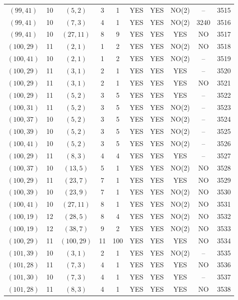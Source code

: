 \begin{longtable}{|c|c|c|c|c|c|c|c|c|c|}
$(99, 41)$ & 10 & $(5, 2)$ & 3 & 1 & YES & YES & NO(2) & -- & 3515\\
$(99, 41)$ & 10 & $(7, 3)$ & 4 & 1 & YES & YES & NO(2) & 3240 & 3516\\
$(99, 41)$ & 10 & $(27, 11)$ & 8 & 9 & YES & YES & YES & NO & 3517\\
$(100, 29)$ & 11 & $(2, 1)$ & 1 & 2 & YES & YES & NO(2) & NO & 3518\\
$(100, 41)$ & 10 & $(2, 1)$ & 1 & 2 & YES & YES & NO(2) & -- & 3519\\
$(100, 29)$ & 11 & $(3, 1)$ & 2 & 1 & YES & YES & YES & -- & 3520\\
$(100, 29)$ & 11 & $(3, 1)$ & 2 & 1 & YES & YES & YES & NO & 3521\\
$(100, 29)$ & 11 & $(5, 2)$ & 3 & 5 & YES & YES & YES & -- & 3522\\
$(100, 31)$ & 11 & $(5, 2)$ & 3 & 5 & YES & YES & NO(2) & -- & 3523\\
$(100, 37)$ & 10 & $(5, 2)$ & 3 & 5 & YES & YES & NO(2) & -- & 3524\\
$(100, 39)$ & 10 & $(5, 2)$ & 3 & 5 & YES & YES & NO(2) & -- & 3525\\
$(100, 41)$ & 10 & $(5, 2)$ & 3 & 5 & YES & YES & NO(2) & -- & 3526\\
$(100, 29)$ & 11 & $(8, 3)$ & 4 & 4 & YES & YES & YES & -- & 3527\\
$(100, 37)$ & 10 & $(13, 5)$ & 5 & 1 & YES & YES & NO(2) & NO & 3528\\
$(100, 29)$ & 11 & $(23, 7)$ & 7 & 1 & YES & YES & YES & NO & 3529\\
$(100, 39)$ & 10 & $(23, 9)$ & 7 & 1 & YES & YES & NO(2) & NO & 3530\\
$(100, 41)$ & 10 & $(27, 11)$ & 8 & 1 & YES & YES & NO(2) & NO & 3531\\
$(100, 19)$ & 12 & $(28, 5)$ & 8 & 4 & YES & YES & NO(2) & NO & 3532\\
$(100, 19)$ & 12 & $(38, 7)$ & 9 & 2 & YES & YES & NO(2) & NO & 3533\\
$(100, 29)$ & 11 & $(100, 29)$ & 11 & 100 & YES & YES & YES & NO & 3534\\
$(101, 39)$ & 10 & $(3, 1)$ & 2 & 1 & YES & YES & NO(2) & -- & 3535\\
$(101, 28)$ & 11 & $(7, 3)$ & 4 & 1 & YES & YES & YES & NO & 3536\\
$(101, 30)$ & 10 & $(7, 3)$ & 4 & 1 & YES & YES & YES & -- & 3537\\
$(101, 28)$ & 11 & $(8, 3)$ & 4 & 1 & YES & YES & YES & NO & 3538\\

\end{longtable}
